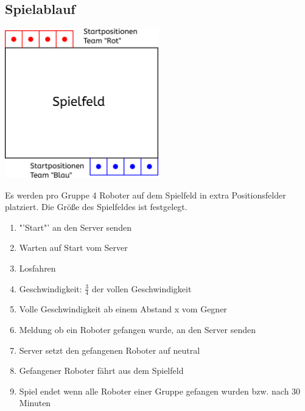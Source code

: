 \subsection{Spielablauf}
\begin{center}
	\includegraphics[width=0.5\textwidth]{Bilder/Spielfeld.pdf}
\end{center}
Es werden pro Gruppe 4 Roboter auf dem Spielfeld in extra Positionsfelder platziert.
Die Größe des Spielfeldes ist festgelegt.

\begin{enumerate}
	\item "'Start"' an den Server senden
	\item Warten auf Start vom Server
	\item Losfahren
	\item Geschwindigkeit: $\frac{3}{4}$ der vollen Geschwindigkeit
	\item Volle Geschwindigkeit ab einem Abstand x vom Gegner
	\item Meldung ob ein Roboter gefangen wurde, an den Server senden
	\item Server setzt den gefangenen Roboter auf neutral
	\item Gefangener Roboter fährt aus dem Spielfeld
	\item Spiel endet wenn alle Roboter einer Gruppe gefangen wurden bzw. nach 30 Minuten
\end{enumerate}